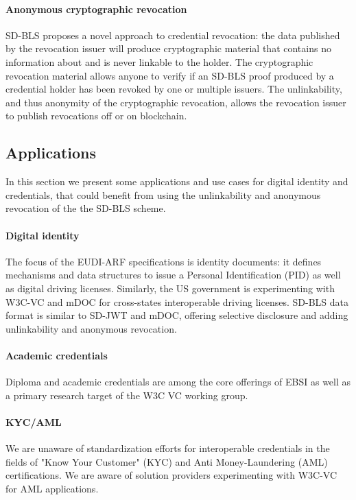 \documentclass[conference]{IEEEtran}
\begin{document}
\paragraph{Anonymous cryptographic revocation}
SD-BLS proposes a novel approach to credential revocation: the data published by the revocation issuer will produce cryptographic material that contains no information about and is  never linkable to the holder. The cryptographic revocation material allows anyone to verify if an SD-BLS proof produced by a credential holder has been revoked by one or multiple issuers. The unlinkability, and thus anonymity of the cryptographic revocation,  allows the revocation issuer to publish revocations off or on blockchain.

\subsection{Applications}
In this section we present some applications and use cases for digital identity and credentials, that could benefit from using the unlinkability and anonymous revocation of the the SD-BLS scheme.

\paragraph{Digital identity}
The focus of the EUDI-ARF specifications is identity documents: it defines mechanisms and data structures to issue a Personal Identification (PID) as well as digital driving licenses. Similarly, the US government is experimenting with W3C-VC and mDOC for cross-states interoperable driving licenses. SD-BLS data format is similar to SD-JWT and mDOC, offering selective disclosure and adding unlinkability and anonymous revocation.

\paragraph{Academic credentials}
Diploma and academic credentials are among the core offerings of EBSI as well as a primary research target of the W3C VC working group.

\paragraph{KYC/AML}
We are unaware of standardization efforts for interoperable credentials in the fields of "Know Your Customer" (KYC) and Anti Money-Laundering (AML) certifications. We are aware of solution providers experimenting with W3C-VC for AML applications.
\end{document}
